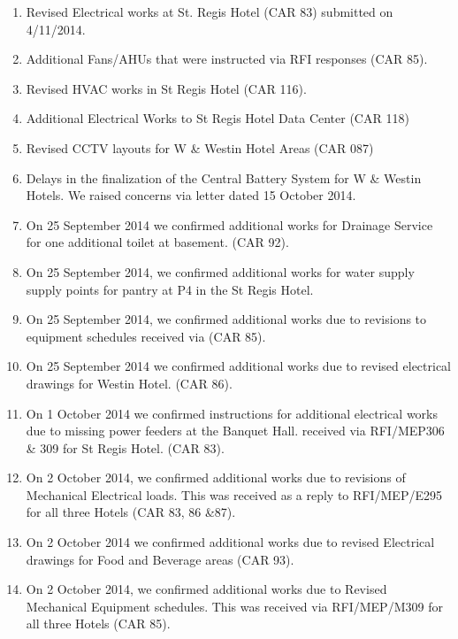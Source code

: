 \begin{enumerate}
\item Revised Electrical works at St. Regis Hotel (CAR 83) submitted on 4/11/2014.

\item Additional Fans/AHUs that were instructed via RFI responses (CAR 85).

\item  Revised HVAC works  in St Regis Hotel (CAR 116).

\item Additional Electrical Works to St Regis Hotel Data Center (CAR 118)

\item Revised CCTV layouts for W \& Westin Hotel Areas (CAR 087)
  
\item Delays in the finalization of the Central Battery System for W \& Westin Hotels. We raised concerns via letter   dated 15 October 2014.

\item On 25 September 2014 we confirmed additional works for Drainage Service for one additional toilet at basement. (CAR 92).

\item On 25 September 2014, we confirmed additional works for water supply supply points for pantry at P4 in the St Regis Hotel.

\item On 25 September 2014, we confirmed additional works due to revisions to equipment schedules received via   (CAR 85).

\item On 25 September 2014 we confirmed additional works due to revised electrical drawings for Westin Hotel. (CAR 86).

\item On 1 October 2014 we confirmed instructions for additional electrical works due to missing power feeders at the Banquet Hall. received via RFI/MEP306 \& 309 for St Regis Hotel. (CAR 83).

\item On 2 October 2014, we confirmed additional works due to revisions of Mechanical Electrical loads. This was received as a reply to RFI/MEP/E295 for all three Hotels (CAR 83, 86 \&87). 

\item On 2 October 2014 we confirmed additional works due to revised Electrical drawings for Food and Beverage areas (CAR 93).

\item On 2 October 2014, we confirmed additional works due to Revised Mechanical Equipment schedules. This was received via RFI/MEP/M309 for all three Hotels (CAR 85).


\end{enumerate}
